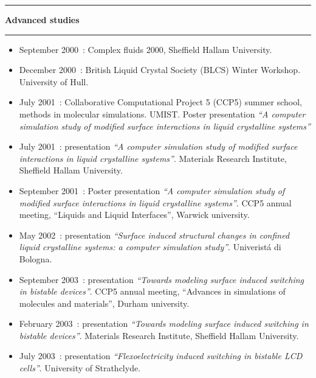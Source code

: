 \newpage
\hrule
\begin{center}
	\textbf{\large Advanced studies}
\end{center}
\hrule
\vspace*{10mm}

\begin{itemize}

\item September 2000~: Complex fluids 2000, Sheffield Hallam University.

\item December 2000~: 
	British Liquid Crystal Society (BLCS) Winter Workshop. University of Hull.
	
\item July 2001~: 
	Collaborative Computational Project 5 (CCP5) summer school, methods in molecular simulations. 
	UMIST.
	Poster presentation \emph{``A computer simulation study of modified surface interactions in
	liquid crystalline systems''}
	
\item July 2001~: 
	presentation \emph{``A computer simulation study of modified surface interactions in
	liquid crystalline systems''}.
	Materials Research Institute, Sheffield Hallam University.

\item September 2001~: 	
	Poster presentation \emph{``A computer simulation study of modified surface interactions in
	liquid crystalline systems''}.
	CCP5 annual meeting, ``Liquids and Liquid Interfaces'', Warwick university.

\item  May 2002~: 
	presentation \emph{``Surface induced structural changes in confined liquid
	crystalline systems: a computer simulation study''}. Univerist\'a di Bologna.

\item September 2003~: 
	presentation \emph{``Towards modeling surface induced switching in bistable devices''}.
	CCP5 annual meeting, ``Advances in simulations of molecules and materials'', Durham university.

\item February 2003~: 
	presentation \emph{``Towards modeling surface induced switching in bistable devices''}. 
	Materials Research Institute, Sheffield Hallam University.

\item July 2003~:
	presentation \emph{``Flexoelectricity induced switching in bistable LCD cells''}. 
	University of Strathclyde.


\end{itemize}


